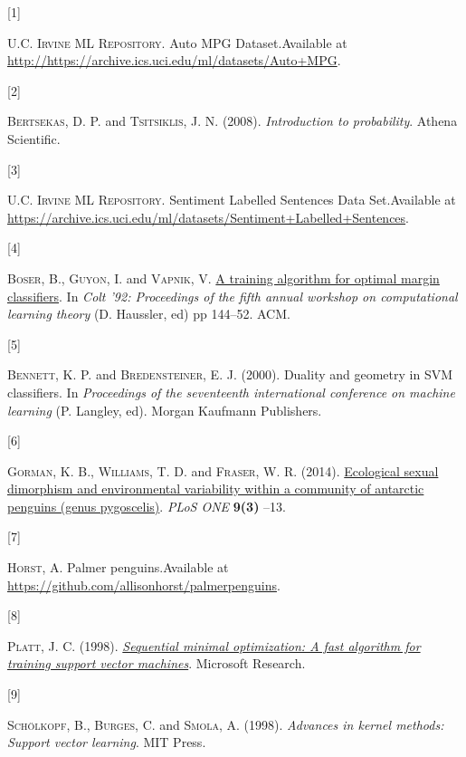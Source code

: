 \documentclass[
  oneside]{scrbook}
\newlength{\cslhangindent}
\newlength{\csllabelwidth}
\newlength{\cslentryspacingunit} %
\newenvironment{CSLReferences}[2] %
 {%
  \setlength{\parindent}{0pt}
  \ifodd #1
  \let\oldpar\par
  \def\par{\hangindent=\cslhangindent\oldpar}
  \fi
  \setlength{\parskip}{#2\cslentryspacingunit}
 }%
 {}
\newcommand{\CSLLeftMargin}[1]{\parbox[t]{\csllabelwidth}{#1}}
\newcommand{\CSLRightInline}[1]{\parbox[t]{\linewidth - \csllabelwidth}{#1}\break}
\begin{document}
\hypertarget{refs}{}
\begin{CSLReferences}{0}{0}
\leavevmode{}%
\CSLLeftMargin{{[}1{]} }
\CSLRightInline{\textsc{U.C. Irvine ML Repository}. {Auto MPG
Dataset}.Available at
\url{http://https://archive.ics.uci.edu/ml/datasets/Auto+MPG}.}

\leavevmode{}%
\CSLLeftMargin{{[}2{]} }
\CSLRightInline{\textsc{Bertsekas}, D. P. and \textsc{Tsitsiklis}, J. N.
(2008). \emph{Introduction to probability}. Athena Scientific.}

\leavevmode{}%
\CSLLeftMargin{{[}3{]} }
\CSLRightInline{\textsc{U.C. Irvine ML Repository}. {Sentiment Labelled
Sentences Data Set}.Available at
\url{https://archive.ics.uci.edu/ml/datasets/Sentiment+Labelled+Sentences}.}

\leavevmode{}%
\CSLLeftMargin{{[}4{]} }
\CSLRightInline{\textsc{Boser}, B., \textsc{Guyon}, I. and
\textsc{Vapnik}, V.
\href{https://dl.acm.org/doi/pdf/10.1145/130385.130401}{{A training
algorithm for optimal margin classifiers}}. In \emph{Colt '92:
Proceedings of the fifth annual workshop on computational learning
theory} (D. Haussler, ed) pp 144--52. ACM.}

\leavevmode{}%
\CSLLeftMargin{{[}5{]} }
\CSLRightInline{\textsc{Bennett}, K. P. and \textsc{Bredensteiner}, E.
J. (2000). Duality and geometry in SVM classifiers. In \emph{Proceedings
of the seventeenth international conference on machine learning} (P.
Langley, ed). Morgan Kaufmann Publishers.}

\leavevmode{}%
\CSLLeftMargin{{[}6{]} }
\CSLRightInline{\textsc{Gorman}, K. B., \textsc{Williams}, T. D. and
\textsc{Fraser}, W. R. (2014).
\href{https://doi.org/10.1371/journal.pone.0090081}{Ecological sexual
dimorphism and environmental variability within a community of antarctic
penguins (genus pygoscelis)}. \emph{PLoS ONE} \textbf{9(3)} --13.}

\leavevmode{}%
\CSLLeftMargin{{[}7{]} }
\CSLRightInline{\textsc{Horst}, A. Palmer penguins.Available at
\url{https://github.com/allisonhorst/palmerpenguins}.}

\leavevmode{}%
\CSLLeftMargin{{[}8{]} }
\CSLRightInline{\textsc{Platt}, J. C. (1998).
\emph{\href{https://www-ai.cs.tu-dortmund.de/LEHRE/SEMINARE/SS09/AKTARBEITENDESDM/LITERATUR/PlattSMO.pdf}{Sequential
minimal optimization: A fast algorithm for training support vector
machines}}. Microsoft Research.}

\leavevmode{}%
\CSLLeftMargin{{[}9{]} }
\CSLRightInline{\textsc{Schölkopf}, B., \textsc{Burges}, C. and
\textsc{Smola}, A. (1998). \emph{Advances in kernel methods: Support
vector learning}. MIT Press.}

\end{CSLReferences}

\backmatter
\end{document}
